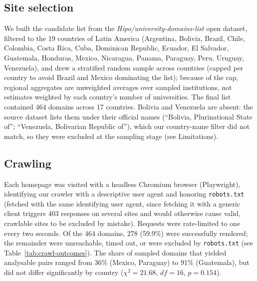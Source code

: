 \documentclass[10pt]{article}
\begin{document}
\subsection{Site selection}
We built the candidate list from the \emph{Hipo/university-domains-list} open dataset, filtered to the 19 countries of Latin America (Argentina, Bolivia, Brazil, Chile, Colombia, Costa Rica, Cuba, Dominican Republic, Ecuador, El Salvador, Guatemala, Honduras, Mexico, Nicaragua, Panama, Paraguay, Peru, Uruguay, Venezuela), and drew a stratified random sample across countries (capped per country to avoid Brazil and Mexico dominating the list); because of the cap, regional aggregates are unweighted averages over sampled institutions, not estimates weighted by each country's number of universities. The final list contained 464 domains across 17 countries. Bolivia and Venezuela are absent: the source dataset lists them under their official names (``Bolivia, Plurinational State of''; ``Venezuela, Bolivarian Republic of''), which our country-name filter did not match, so they were excluded at the sampling stage (see Limitations).

\subsection{Crawling}
Each homepage was visited with a headless Chromium browser (Playwright), identifying our crawler with a descriptive user agent and honoring \texttt{robots.txt} (fetched with the same identifying user agent, since fetching it with a generic client triggers 403 responses on several sites and would otherwise cause valid, crawlable sites to be excluded by mistake). Requests were rate-limited to one every two seconds. Of the 464 domains, 278 (59.9\%) were successfully rendered; the remainder were unreachable, timed out, or were excluded by \texttt{robots.txt} (see Table~\ref{tab:crawl-outcomes}). The share of sampled domains that yielded analysable pairs ranged from 36\% (Mexico, Paraguay) to 91\% (Guatemala), but did not differ significantly by country ($\chi^2 = 21.68$, $df = 16$, $p = 0.154$).
\end{document}
